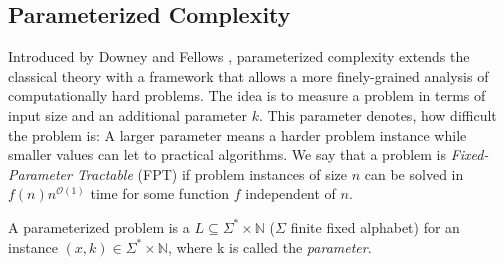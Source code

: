 

\subsection{Parameterized Complexity}

Introduced by Downey and Fellows \cite{Downey1999a}, parameterized complexity extends the classical theory with a framework that allows a more finely-grained analysis of computationally hard problems. 
The idea is to measure a problem in terms of input size and an additional parameter $k$. 
This parameter denotes, how difficult the problem is: A larger parameter means a harder problem instance while smaller values can let to practical algorithms. 
We say that a problem is \textit{Fixed-Parameter Tractable} (FPT) if problem instances of size $n$ can be solved in $f(n)n^{\mathcal{O}(1)}$ time for some function $f$ independent of $n$. 


\begin{definition}
    A parameterized problem is a $L\subseteq\Sigma^*\times \mathbb{N}$ ($\Sigma$ finite fixed alphabet) for an instance $(x,k)\in \Sigma^*\times \mathbb{N}$, where k is called the \textit{parameter}.
\end{definition}

